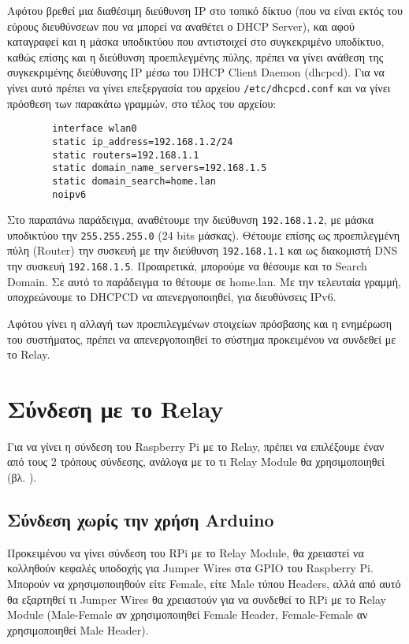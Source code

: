 		Αφότου βρεθεί μια διαθέσιμη διεύθυνση IP στο τοπικό δίκτυο (που να είναι εκτός του εύρους διευθύνσεων που να μπορεί να αναθέτει ο DHCP Server), και αφού καταγραφεί και η μάσκα υποδικτύου που αντιστοιχεί στο συγκεκριμένο υποδίκτυο, καθώς επίσης και η διεύθυνση προεπιλεγμένης πύλης, πρέπει να γίνει ανάθεση της συγκεκριμένης διεύθυνσης IP μέσω του DHCP Client Daemon (dhcpcd). Για να γίνει αυτό πρέπει να γίνει επεξεργασία του αρχείου \verb|/etc/dhcpcd.conf| και να γίνει πρόσθεση των παρακάτω γραμμών, στο τέλος του αρχείου:

		\begin{lstlisting}
		interface wlan0
		static ip_address=192.168.1.2/24
		static routers=192.168.1.1
		static domain_name_servers=192.168.1.5
		static domain_search=home.lan
		noipv6\end{lstlisting}

		Στο παραπάνω παράδειγμα, αναθέτουμε την διεύθυνση \verb|192.168.1.2|, με μάσκα υποδικτύου την \verb|255.255.255.0| (24 bits μάσκας). Θέτουμε επίσης ως προεπιλεγμένη πύλη (Router) την συσκευή με την διεύθυνση \verb|192.168.1.1| και ως διακομιστή DNS την συσκευή \verb|192.168.1.5|. Προαιρετικά, μπορούμε να θέσουμε και το Search Domain. Σε αυτό το παράδειγμα το θέτουμε σε home.lan. Με την τελευταία γραμμή, υποχρεώνουμε το DHCPCD να απενεργοποιηθεί, για διευθύνσεις IPv6.

	Αφότου γίνει η αλλαγή των προεπιλεγμένων στοιχείων πρόσβασης και η ενημέρωση του συστήματος, πρέπει να απενεργοποιηθεί το σύστημα προκειμένου να συνδεθεί με το Relay. 

\section{Σύνδεση με το Relay}
	Για να γίνει η σύνδεση του Raspberry Pi με το Relay, πρέπει να επιλέξουμε έναν από τους 2 τρόπους σύνδεσης, ανάλογα με το τι Relay Module θα χρησιμοποιηθεί (βλ. ).

	\subsection{Σύνδεση χωρίς την χρήση Arduino}
		\label{subsec:gpio_conn}
		Προκειμένου να γίνει σύνδεση του RPi με το Relay Module, θα χρειαστεί να κολληθούν κεφαλές υποδοχής για Jumper Wires στα GPIO του Raspberry Pi. Μπορούν να χρησιμοποιηθούν είτε Female, είτε Male τύπου Headers, αλλά από αυτό θα εξαρτηθεί τι Jumper Wires θα χρειαστούν για να συνδεθεί το RPi με το Relay Module (Male-Female αν χρησιμοποιηθεί Female Header, Female-Female αν χρησιμοποιηθεί Male Header).

